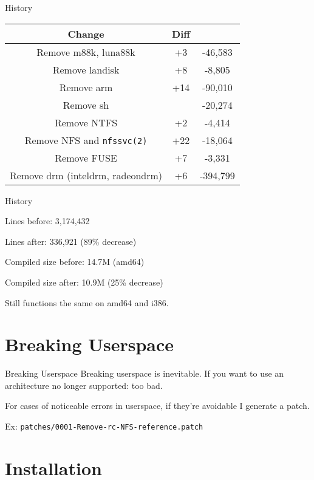 \documentclass{beamer}
\begin{document}
\begin{frame}{History}
	\begin{table}
		\begin{tabular}{|c|c c|}
			\hline
			Change & Diff & \\
			\hline
			Remove m88k, luna88k & +3 & -46,583 \\
			Remove landisk & +8 & -8,805 \\
			Remove arm & +14 & -90,010 \\
			Remove sh & & -20,274 \\
			Remove NTFS & +2 & -4,414 \\
			Remove NFS and \texttt{nfssvc(2)} & +22 & -18,064 \\
			Remove FUSE & +7 & -3,331 \\
			Remove drm (inteldrm, radeondrm) & +6 & -394,799 \\
			\hline
		\end{tabular}
	\end{table}
\end{frame}

\begin{frame}{History}
	\setlength{\parskip}{\baselineskip}

	Lines before: 3,174,432

	Lines after: 336,921 (89\% decrease)

	Compiled size before: 14.7M (amd64)

	Compiled size after: 10.9M (25\% decrease)

	Still functions the same on amd64 and i386.
\end{frame}

\section{Breaking Userspace}

\begin{frame}{Breaking Userspace}
	Breaking userspace is inevitable. If you want to use an architecture no
	longer supported: too bad.

	For cases of noticeable errors in userspace, if they're avoidable I
	generate a patch.

	Ex: \texttt{patches/0001-Remove-rc-NFS-reference.patch}
\end{frame}

\section{Installation}
\end{document}
